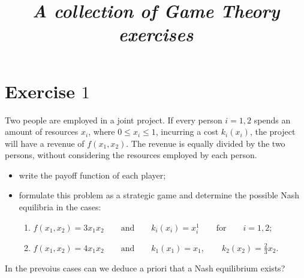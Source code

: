 \documentclass[a4paper, twoside, openany]{book}
\title{\textbf{\huge{\textit{A collection of Game Theory exercises}}}}
\begin{document}
\maketitle
\section*{Exercise $1$}
Two people are employed in a joint project. If every person $i=1,2$ spends an amount of resources $x_i$, where $0 \leq x_i \leq 1$, incurring a cost $k_i(x_i)$, the project will have a revenue of $f(x_1, x_2)$. The revenue is equally divided by the two persons, without considering the resources employed by each person.
\begin{itemize}
\item write the payoff function of each player;
\item formulate this problem as a strategic game and determine the possible Nash equilibria in the cases: 
				\begin{enumerate}
				\item $f(x_1, x_2) = 3 x_1 x_2 \qquad \textrm{and} \qquad k_i(x_i) = x_i^1 \qquad \textrm{for} \qquad i=1,2$;
				\item $f(x_1, x_2) = 4 x_1 x_2 \qquad \textrm{and} \qquad k_1(x_1) = x_1, \qquad k_2(x_2) = \frac{2}{3}x_2$.
				\end{enumerate}
\end{itemize}
In the prevoius cases can we deduce a priori that a Nash equilibrium exists?
\end{document}

